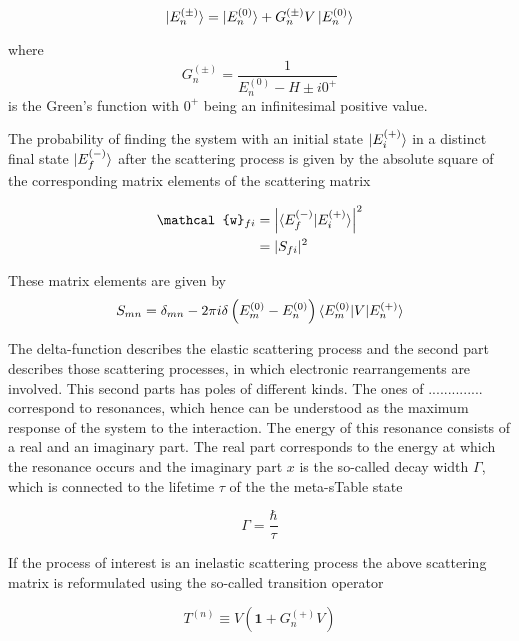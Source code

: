 \begin{equation} \label{equation:LippmannSchwinger}
 \ket{E_n^{(\pm)}} =  \ket{E_n^{(0)}} + G_n^{(\pm)}V \ket{E_n^{(0)}}
\end{equation}

where
\begin{equation}
 G_n^{(\pm)} = \frac{1}{E_n^{(0)}-H \pm i0^+}
\end{equation}
is the Green's function with $0^+$ being an infinitesimal positive value.

The probability of finding the system with an initial state $\ket{E_i^{(+)}}$
in a distinct final state $\ket{E_f^{(-)}}$ after the scattering process
is given by the absolute square of the corresponding matrix elements
of the scattering matrix

\begin{align}
 \mathcal{w}_{fi} &= \left | \braket{E_f^{(-)} | E_i^{(+)}} \right|^2\\
                  &= |S_{fi}|^2
\end{align}

These matrix elements are given by
\begin{equation}
 S_{mn} = \delta_{mn} - 2\pi i \delta \left(E_m^{(0)} - E_n^{(0)} \right)
          \braket{E_m^{(0)}| V |E_n^{(+)}}
\end{equation}

The delta-function describes the elastic scattering process and the second
part describes those scattering processes, in which electronic rearrangements
are involved. This second parts has poles of different kinds. The ones
of ..............
correspond to resonances, which hence can be understood as the maximum
response of the system to the interaction. The energy of this resonance
consists of a real and an imaginary part. The real part corresponds to the
energy at which the resonance occurs and the imaginary part $x$
is the so-called decay width $\Gamma$, which is connected to the lifetime
$\tau$ of the the meta-sTable state

\begin{equation}
 \Gamma = \frac{\hbar}{\tau}
\end{equation}

If the process of interest is an inelastic scattering process the
above scattering matrix is reformulated using the so-called transition
operator

\begin{equation}
 T^{(n)} \equiv V \left( \mathbf{1} + G_n^{(+)} V \right)
\end{equation}

